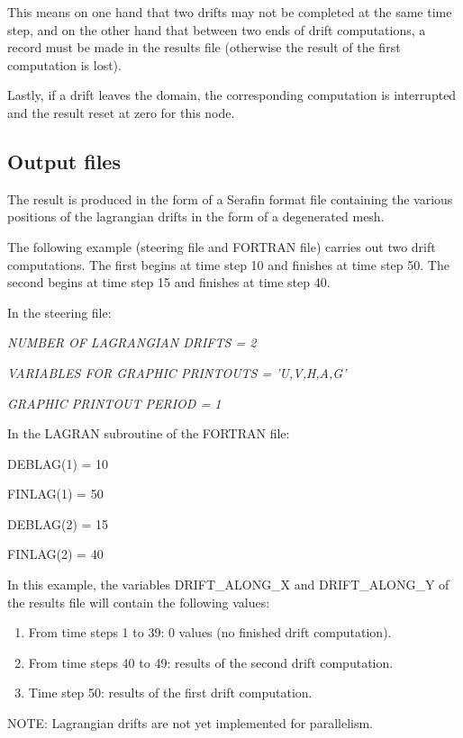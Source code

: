  This means on one hand that two drifts may not be completed at the same time step, and on the other hand that between two ends of drift computations, a record must be made in the results file (otherwise the result of the first computation is lost).

 Lastly, if a drift leaves the domain, the corresponding computation is interrupted and the result reset at zero for this node.


\subsection{ Output files}

 The result is produced in the form of a Serafin format file containing the various positions of the lagrangian drifts in the form of a degenerated mesh.



  The following example (steering file and FORTRAN file) carries out two drift computations. The first begins at time step 10 and finishes at time step 50. The second begins at time step 15 and finishes at time step 40.

  In the steering file:

   \textit{NUMBER OF LAGRANGIAN DRIFTS   = 2}

\textit{   VARIABLES FOR GRAPHIC PRINTOUTS = 'U,V,H,A,G'}

\textit{   GRAPHIC PRINTOUT PERIOD = 1}

  In the LAGRAN subroutine of the FORTRAN file:

   DEBLAG(1) = 10

   FINLAG(1) = 50

   DEBLAG(2) = 15

   FINLAG(2) = 40

 In this example, the variables DRIFT\_ALONG\_X and DRIFT\_ALONG\_Y of the results file will contain the following values:

\begin{enumerate}
\item  From time steps 1 to 39: 0 values (no finished drift computation).

\item  From time steps 40 to 49: results of the second drift computation.

\item  Time step 50: results of the first drift computation.
\end{enumerate}



 NOTE: Lagrangian drifts are not yet implemented for parallelism.

